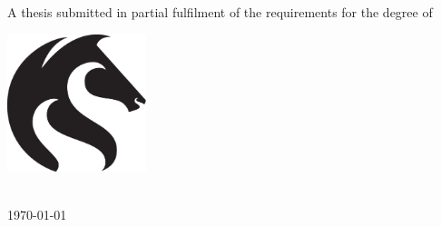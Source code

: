 
\begin{titlepage}
\makeatletter

	\vspace*{\fill}
		
	\begin{flushleft}

		\begin{flushleft}
			\huge\textbf{\textsf{\@title}}
		\end{flushleft}

		\vspace{0.5cm}\par
		\begin{center}
			\LARGE\textbf{\@author}
		\end{center}

		\vspace{0.5cm}\par
		\Large{A thesis submitted in partial fulfilment of the requirements for the degree of \degree}

	\end{flushleft}

	\vspace{1cm}\par

	\begin{center}

		\begin{center}
			\includegraphics[height=4cm]{images/title/uon_logo}
		\end{center}

		\vspace{1cm}\par

		\Large{\institute \\ \today}

	\end{center}

	\vspace*{\fill}

\makeatother
\end{titlepage}
